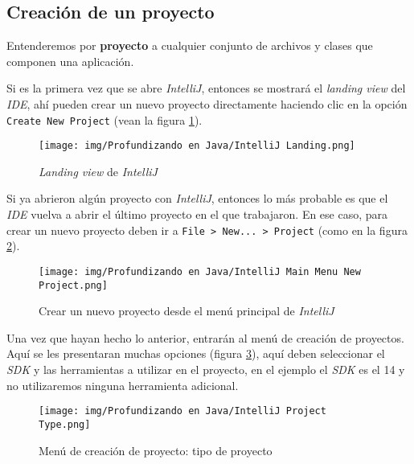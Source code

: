 \subsection{Creación de un proyecto}
  Entenderemos por \textbf{proyecto} a cualquier conjunto de archivos y clases que 
  componen una aplicación.
  
  Si es la primera vez que se abre \textit{IntelliJ}, entonces se mostrará el 
  \textit{landing view} del \textit{IDE}, ahí pueden crear un nuevo proyecto 
  directamente haciendo clic en la opción \texttt{Create New Project} (vean la figura 
  \ref{fig:intellij-lv}).

  \begin{figure}[ht!]
    \centering
    \texttt{[image: img/Profundizando en Java/IntelliJ Landing.png]}
    \caption{\textit{Landing view} de \textit{IntelliJ}}
    \label{fig:intellij-lv}
  \end{figure}

  Si ya abrieron algún proyecto con \textit{IntelliJ}, entonces lo más probable es que
  el \textit{IDE} vuelva a abrir el último proyecto en el que trabajaron.
  En ese caso, para crear un nuevo proyecto deben ir a \texttt{File > New... > Project} 
  (como en la figura \ref{fig:intellij-project-1}).

  \begin{figure}[ht!]
    \centering
    \texttt{[image: img/Profundizando en Java/IntelliJ Main Menu New Project.png]}
    \caption{Crear un nuevo proyecto desde el menú principal de \textit{IntelliJ}}
    \label{fig:intellij-project-1}
  \end{figure}

  \newpage
  Una vez que hayan hecho lo anterior, entrarán al menú de creación de proyectos.
  Aquí se les presentaran muchas opciones (figura \ref{fig:intellij-project-2}), aquí 
  deben seleccionar el \textit{SDK} y las herramientas a utilizar en el proyecto, en el 
  ejemplo el \textit{SDK} es el 14 y no utilizaremos ninguna herramienta adicional.

  \begin{figure}[ht!]
    \centering
    \texttt{[image: img/Profundizando en Java/IntelliJ Project Type.png]}
    \caption{Menú de creación de proyecto: tipo de proyecto}
    \label{fig:intellij-project-2}
  \end{figure}

